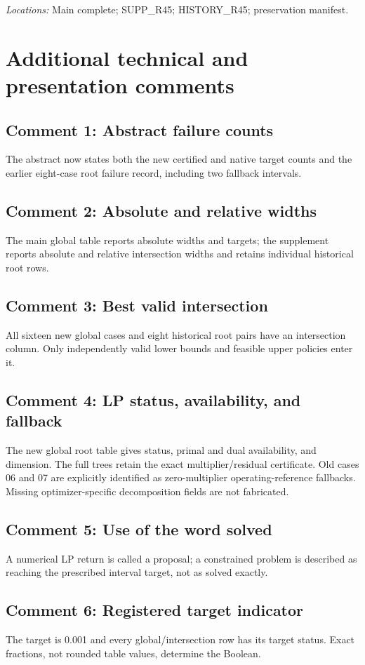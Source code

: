 \noindent\textit{Locations:} Main complete; SUPP\_R45; HISTORY\_R45; preservation manifest.

\section{Additional technical and presentation comments}
\subsection{Comment 1: Abstract failure counts}
The abstract now states both the new certified and native target counts and the earlier eight-case root failure record, including two fallback intervals.

\subsection{Comment 2: Absolute and relative widths}
The main global table reports absolute widths and targets; the supplement reports absolute and relative intersection widths and retains individual historical root rows.

\subsection{Comment 3: Best valid intersection}
All sixteen new global cases and eight historical root pairs have an intersection column. Only independently valid lower bounds and feasible upper policies enter it.

\subsection{Comment 4: LP status, availability, and fallback}
The new global root table gives status, primal and dual availability, and dimension. The full trees retain the exact multiplier/residual certificate. Old cases 06 and 07 are explicitly identified as zero-multiplier operating-reference fallbacks. Missing optimizer-specific decomposition fields are not fabricated.

\subsection{Comment 5: Use of the word solved}
A numerical LP return is called a proposal; a constrained problem is described as reaching the prescribed interval target, not as solved exactly.

\subsection{Comment 6: Registered target indicator}
The target is 0.001 and every global/intersection row has its target status. Exact fractions, not rounded table values, determine the Boolean.

